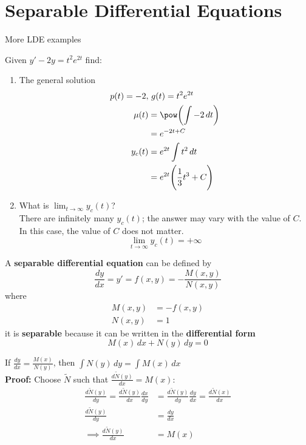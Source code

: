 \documentclass[twoside]{report}
\begin{document}
    \chapter{Separable Differential Equations}
    More LDE examples
    \begin{example}
        Given $y'-2y=t^{2}e^{2t}$ find:
        \begin{enumerate}
            \item The general solution
            \begin{align}
                p(t) = -2,&\ g(t) = t^{2}e^{2t}\\
                \mu(t) %
                &= \pow\bbbp{\int -2\,dt}\\
                &= e^{-2t+C}\\
                y_c(t) &= e^{2t}\int t^{2}\,dt\\
                &= e^{2t}\BBp{\frac{1}{3}t^{3} + C}
            \end{align}
            \item What is $\lim_{t \rightarrow \infty} y_c(t)$?\\
            There are infinitely many $y_c(t)$; the answer may vary with the value of $C$. In this case, the value of $C$ does not matter.
            $$\lim_{t \rightarrow \infty} y_{c}(t) = +\infty$$
        \end{enumerate}
    \end{example}
    \np
    \begin{definition}
        A \textbf{separable differential equation} can be defined by
        \begin{equation}
            \frac{dy}{dx}=y'=f(x, y)=-\frac{M(x, y)}{N(x, y)}
        \end{equation}
        where
        \begin{align}
            M(x, y) &= - f(x, y)\\
            N(x, y) &= 1
        \end{align}
        it is \textbf{separable} because it can be written in the \textbf{differential form}
        \begin{equation}
            M(x)\,dx+N(y)\,dy=0
        \end{equation}
    \end{definition}
    \begin{btheorem}
        If $\frac{dy}{dx} = \frac{M(x)}{N(y)}$, then $\int N(y)\,dy=\int M(x)\,dx$\\
        \textbf{Proof:} Choose $\widetilde{N}$ such that $\frac{d\widetilde{N}(y)}{dx} = M(x)$:
        \begin{align}
            \frac{d\widetilde{N}(y)}{dy} = \frac{d\widetilde{N}(y)}{dx}\frac{dx}{dy} &= \frac{d\widetilde{N}(y)}{dy}\frac{dy}{dx}= \frac{d\widetilde{N}(x)}{dx}\\
            \frac{d\widetilde{N}(y)}{dy} &= \frac{dy}{dx}
            \\
            \implies \frac{d\widetilde{N}(y)}{dx} &= M(x)
        \end{align}
    \end{btheorem}
\end{document}
